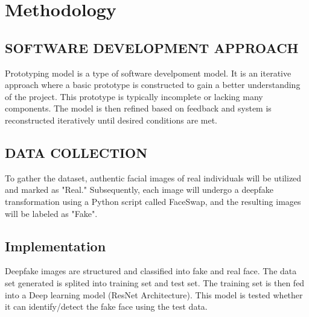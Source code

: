     \chapter{Methodology}
       \section{SOFTWARE DEVELOPMENT APPROACH}
        Prototyping model is a type of software develpoment model. It is an iterative approach where a basic prototype is constructed to gain a better understanding of the project. This prototype is typically incomplete or lacking many components. The model is then refined based on feedback and system is reconstructed iteratively until desired conditions are met.
         \begin{figure}[hbt!]
        \end{figure}
        \section{DATA COLLECTION}
        To gather the dataset, authentic facial images of real individuals will be utilized and marked as "Real." Subsequently, each image will undergo a deepfake transformation using a Python script called FaceSwap, and the resulting images will be labeled as "Fake".
    
        \section{Implementation}
        Deepfake images are structured and classified into fake and real face. The data set generated is splited into training set and test set. The training set is then fed into a Deep learning model (ResNet Architecture). This model is tested whether it can identify/detect the fake face using the test data.

